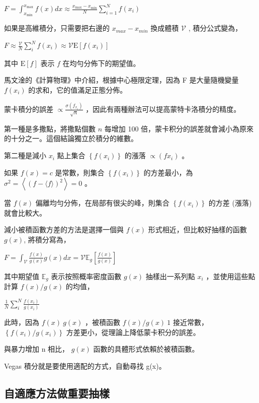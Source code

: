 \documentclass[10pt,UTF8]{ctexart}
\begin{document}
$F=\int_{x_{\min }}^{x_{\max }} f(x) d x \approx \frac{x_{\max }-x_{\min }}{N} \sum_{i=1}^{N} f\left(x_{i}\right)$

如果是高維積分，只需要把右邊的 $x_{max} - x_{min}$ 換成體積 $\mathcal{V}$ , 積分公式變為，

$F \approx \frac{\mathcal{V}}{N} \sum_{i}^{N} f\left(x_{i}\right) \approx \mathcal{V} \mathrm{E}\left[f\left(x_{i}\right)\right] $

其中 $\mathrm{E}[f]$ 表示 $f$ 在均勻分佈下的期望值。

馬文淦的《計算物理》中介紹，根據中心極限定理，因為 F 是大量隨機變量 $f(x_{i})$ 的求和，它的值滿足正態分佈。

蒙卡積分的誤差 $\propto \frac{\sigma\left(f_{x_{i}}\right)}{\sqrt{n}}$ ，因此有兩種辦法可以提高蒙特卡洛積分的精度。

第一種是多撒點，將撒點個數 $n$ 每增加 100 倍，蒙卡积分的誤差就會減小為原來的十分之一。這個結論獨立於積分的維數。

第二種是減小 $x_{i}$ 點上集合 $\left\{f\left(x_{i}\right)\right\}$ 的漲落 $\propto (f x_{i})$ 。

如果 $f(x) = c$ 是常數，則集合 $\left\{f\left(x_{i}\right)\right\}$ 的方差最小，為 $\sigma^{2}=\left\langle(f-\langle f\rangle)^{2}\right\rangle=0$ 。

當 $f(x)$ 偏離均勻分佈，在局部有很尖的峰，則集合  $\left\{f\left(x_{i}\right)\right\}$ 的方差 (漲落) 就會比較大。

減小被積函數方差的方法是選擇一個與 $f(x)$ 形式相近，但比較好抽樣的函數 $g(x)$, 將積分寫為，

$F=\int_{\mathcal{V}} \frac{f(x)}{g(x)} g(x) d x=\mathcal{V} \mathbb{E}_{g}\left[\frac{f(x)}{g(x)}\right] $

其中期望值 $\mathbb{E}_{g}$ 表示按照概率密度函數 $g(x)$ 抽樣出一系列點 $x_{i}$ ，並使用這些點計算 $f(x)/g(x)$ 的均值，

$\frac{1}{N} \sum_{i}^{N} \frac{f\left(x_{i}\right)}{g\left(x_{i}\right)}$

此時，因為 $f(x) ~ g(x)$ ，被積函數 $f(x)/g(x) ~ 1$ 接近常數， $\left\{f\left(x_{i}\right) / g\left(x_{i}\right) \right\}$ 方差更小，從理論上降低蒙卡积分的誤差。

與暴力增加 n 相比， $g(x)$ 函數的具體形式依賴於被積函數。

Vegas 積分就是要使用適配的方式，自動尋找 g(x)。

\subsection{自適應方法做重要抽樣}
\end{document}
